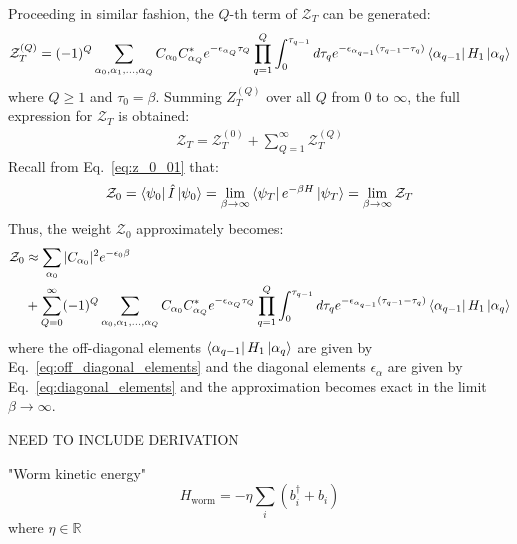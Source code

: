 \documentclass[12pt, two sided]{article}
\begin{document}
Proceeding in similar fashion, the $Q$-th term of $\mathcal{Z}_T$ can be generated:
\begin{equation}
\label{eq:Z^q}
\mathcal{Z}_T^{(Q)} = (-1)^{Q}  \sum_{\alpha_0,\alpha_1,\dots,\alpha_Q} C_{\alpha_0} C_{\alpha_Q}^* e^{-\epsilon_{\alpha_Q} \tau_Q} \prod_{q=1}^Q \int_0^{\tau_{q-1}} d\tau_q e^{-\epsilon_{\alpha_{q-1}}(\tau_{q-1}-\tau_q)} 
\bra{\alpha_{q-1}} H_1 \ket{\alpha_q}
\end{equation}
where $Q \geq 1$ and $\tau_0 = \beta$. Summing $Z_T^{(Q)}$ over all $Q$ from $0$ to $\infty$, the full expression for $\mathcal{Z}_T$ is obtained:
%
\begin{equation}
\begin{aligned}
\mathcal{Z}_T = \mathcal{Z}_T^{(0)} + \sum_{Q=1}^{\infty} \mathcal{Z}_T^{(Q)}
\end{aligned}
\end{equation}
%
Recall from Eq.~\eqref{eq:z_0_01} that:
%
\begin{equation}
\mathcal{Z}_0 = \bra{\psi_0} \hat{I} \ket{\psi_0} = \lim_{\beta\to\infty} \bra{\psi_T} e^{-\beta H} \ket{\psi_T} = \lim_{\beta\to\infty} \mathcal{Z}_T
\end{equation}
%
Thus, the weight $\mathcal{Z}_0$ approximately becomes:
\begin{equation}
\begin{aligned}
\label{eq:Z_0}
\mathcal{Z}_0 &\approx \sum_{\alpha_0} \vert C_{\alpha_0} \vert^2 e^{-\epsilon_{0} \beta} \\ &+ 
\sum_{Q=0}^{\infty} (-1)^{Q}  \sum_{\alpha_0,\alpha_1,\dots,\alpha_Q} C_{\alpha_0} C_{\alpha_Q}^* e^{-\epsilon_{\alpha_Q} \tau_Q} \prod_{q=1}^Q \int_0^{\tau_{q-1}} d\tau_q e^{-\epsilon_{\alpha_{q-1}}(\tau_{q-1}-\tau_q)} 
\bra{\alpha_{q-1}} H_1 \ket{\alpha_q}
\end{aligned}
\end{equation}
where the off-diagonal elements $\bra{\alpha_{q-1}} H_1 \ket{\alpha_q}$ are given by Eq.~\eqref{eq:off_diagonal_elements} and the diagonal elements $\epsilon_{\alpha}$ are given by Eq.~\eqref{eq:diagonal_elements} and the approximation becomes exact in the limit $\beta\to\infty$.

NEED TO INCLUDE DERIVATION 


"Worm kinetic energy"
%
\begin{equation}
H_{\mathrm{worm}} = - \eta \sum_i (b_i^\dag + b_i)
\end{equation}
%
where $\eta \in \mathbb{R}$
\end{document}
